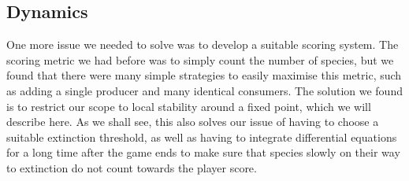 \subsection{Dynamics}
One more issue we needed to solve was to develop a suitable scoring system.
The scoring metric we had before was to simply count the number of species, but we found that there were many simple strategies to easily maximise this metric, such as adding a single producer and many identical consumers.
The solution we found is to restrict our scope to local stability around a fixed point, which we will describe here. 
As we shall see, this also solves our issue of having to choose a suitable extinction threshold, as well as having to integrate differential equations for a long time after the game ends to make sure that species slowly on their way to extinction do not count towards the player score.

